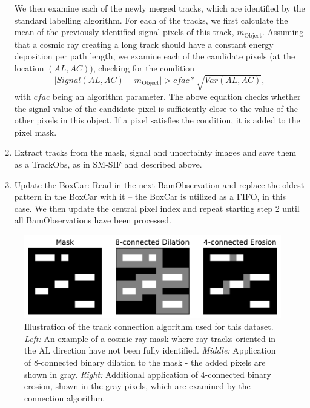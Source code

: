 \documentclass[a4paper, 11pt]{article}
\begin{document}
\begin{enumerate}
    We then examine each of the newly merged tracks, which are identified by the standard labelling algorithm. For each of the tracks, we first calculate the mean of the previously identified signal pixels of this track, $m_\mathrm{Object}$. Assuming that a cosmic ray creating a long track should have a constant energy deposition per path length, we examine each of the candidate pixels (at the location $\left(AL,AC\right)$), checking for the condition
    \begin{equation}
      \lvert Signal\left( AL,AC \right) - m_\mathrm{Object}\rvert > cfac * \sqrt{Var\left( AL,AC \right)},
    \end{equation}
    with $cfac$ being an algorithm parameter. The above equation checks whether the signal value of the candidate pixel is sufficiently close to the value of the other pixels in this object. If a pixel satisfies the condition, it is added to the pixel mask. 
  \item Extract tracks from the mask, signal and uncertainty images and save them as a TrackObs, as in SM-SIF and described above.
  \item Update the BoxCar: Read in the next BamObservation and replace the oldest pattern in the BoxCar with it -- the BoxCar is utilized as a FIFO, in this case. We then update the central pixel index and repeat starting step 2 until all BamObservations have been processed.
\end{enumerate}

\begin{figure}
  \centering
  \includegraphics{images/extraction/BAM-OBS_connection}
  \caption{Illustration of the track connection algorithm used for this dataset. \textit{Left:} An example of a cosmic ray mask where ray tracks oriented in the AL direction have not been fully identified. \textit{Middle:} Application of 8-connected binary dilation to the mask - the added pixels are shown in gray. \textit{Right:} Additional application of 4-connected binary erosion, shown in the gray pixels, which are examined by the connection algorithm.}
  \label{fig:BAM_connection}
\end{figure}
\end{document}
